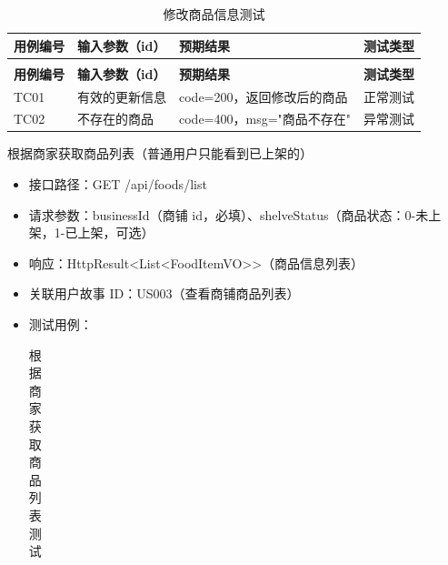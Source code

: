 \begin{levellist}
\begin{levellist}
\begin{itemize}
\begin{longtable}{>{\centering\arraybackslash}m{1.7cm} >{\centering\arraybackslash}m{3cm} >{\centering\arraybackslash}m{6.3cm} >{\centering\arraybackslash}m{2cm}}
                      \caption{修改商品信息测试} \label{tab:training}                                  \\

                      \toprule
                      \textbf{用例编号} & \textbf{输入参数（id）} & \textbf{预期结果}        & \textbf{测试类型} \\
                      \midrule
                      \endfirsthead

                      \multicolumn{4}{c}{{\tablename\ \thetable{} 续表}}                         \\
                      \toprule
                      \textbf{用例编号} & \textbf{输入参数（id）} & \textbf{预期结果}        & \textbf{测试类型} \\
                      \midrule
                      \endhead

                      \bottomrule
                      \endfoot

                      TC01          & 有效的更新信息           & code=200，返回修改后的商品    & 正常测试          \\
                      TC02          & 不存在的商品            & code=400，msg="商品不存在" & 异常测试          \\
                  \end{longtable}
        \end{itemize}

        \item 根据商家获取商品列表（普通用户只能看到已上架的）
        \begin{itemize}
            \item 接口路径：GET /api/foods/list
            \item 请求参数：businessId（商铺 id，必填）、shelveStatus（商品状态：0-未上架，1-已上架，可选）
            \item 响应：HttpResult<List<FoodItemVO>>（商品信息列表）
            \item 关联用户故事 ID：US003（查看商铺商品列表）
            \item 测试用例：
                  \begin{longtable}{>{\centering\arraybackslash}m{1.7cm} >{\centering\arraybackslash}m{3cm} >{\centering\arraybackslash}m{6.3cm} >{\centering\arraybackslash}m{2cm}}

                      \caption{根据商家获取商品列表测试} \label{tab:training}                                        \\


\end{longtable}
\end{itemize}
\end{levellist}
\end{levellist}
